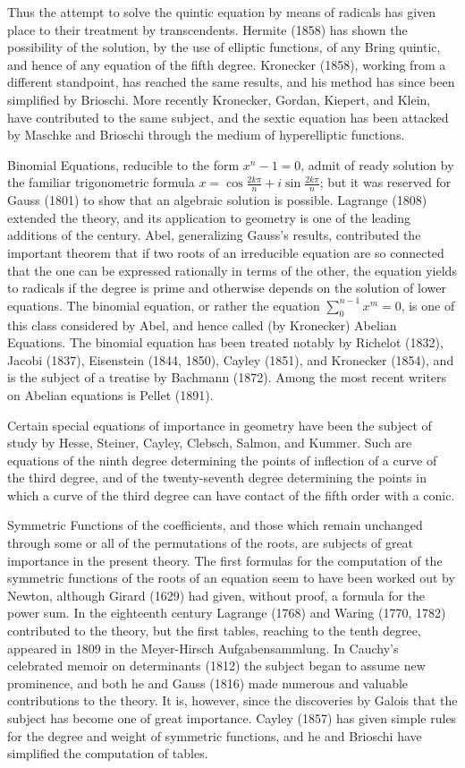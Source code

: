 \documentclass[oneside]{book}
\begin{document}
{Thus the attempt to solve the quintic equation by means of radicals
has given place to their treatment by transcendents. Hermite (1858)
has shown the possibility of the solution, by the use of elliptic
functions, of any Bring quintic, and hence of any equation of the
fifth degree. Kronecker (1858), working from a different standpoint,
has reached the same results, and his method has since been
simplified by Brioschi. More recently Kronecker, Gordan, Kiepert,
and Klein, have contributed to the same subject, and the sextic
equation has been attacked by Maschke and Brioschi through the
medium of hyperelliptic functions.

Binomial Equations, reducible to the form $x^n - 1 = 0$, admit of
ready solution by the familiar trigonometric formula $x =
\cos\frac{2k\pi}{n} + i\sin\frac{2k\pi}{n}$; but it was reserved for
Gauss (1801) to show that an algebraic solution is
possible. Lagrange (1808) extended the theory, and its application
to geometry is one of the leading additions of the century. Abel,
generalizing Gauss's results, contributed the important theorem that
if two roots of an irreducible equation are so connected that the
one can be expressed rationally in terms of the other, the equation
yields to radicals if the degree is prime and otherwise depends on
the solution of lower equations. The binomial equation, or rather
the equation $\sum_0^{n-1} x^m = 0$, is one of this class
considered by Abel, and hence called (by Kronecker) Abelian
Equations. The binomial equation has been treated notably by
Richelot (1832), Jacobi (1837), Eisenstein (1844, 1850), Cayley
(1851), and Kronecker (1854), and is the subject of a treatise by
Bachmann (1872). Among the most recent writers on Abelian equations
is Pellet (1891).

Certain special equations of importance in geometry have been the
subject of study by Hesse, Steiner, Cayley, Clebsch, Salmon, and
Kummer. Such are equations of the ninth degree determining the
points of inflection of a curve of the third degree, and of the
twenty-seventh degree determining the points in which a curve of the
third degree can have contact of the fifth order with a conic.

Symmetric Functions of the coefficients, and those which remain
unchanged through some or all of the permutations of the roots, are
subjects of great importance in the present theory. The first
formulas for the computation of the symmetric functions of the
roots of an equation seem to have been worked out by Newton,
although Girard (1629) had given, without proof, a formula for the
power sum. In the eighteenth century Lagrange (1768) and Waring
(1770, 1782) contributed to the theory, but the first tables,
reaching to the tenth degree, appeared in 1809 in the Meyer-Hirsch
Aufgabensammlung. In Cauchy's celebrated memoir on determinants
(1812) the subject began to assume new prominence, and both he and
Gauss (1816) made numerous and valuable contributions to the
theory. It is, however, since the discoveries by Galois that the
subject has become one of great importance. Cayley (1857) has given
simple rules for the degree and weight of symmetric functions, and
he and Brioschi have simplified the computation of tables.

}
\end{document}

